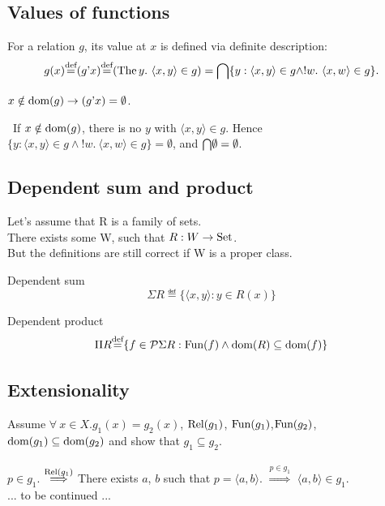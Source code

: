 \documentclass[10pt,a4paper]{article}
\begin{document}
\subsection{Values of functions}
For a relation $g$, its value at $x$ is defined via definite description:
$$g(x) {\stackrel{{\textrm{def}}}{=}} (g{\textrm{'}} x) {\stackrel{{\textrm{def}}}{=}} ({\textrm{The\,}} y.\ \langle x, y\rangle \in g) = {\bigcap} \{y : \langle x,y\rangle \in g \land !w.\ \langle x,w\rangle \in g\}.$$

\begin{exercise}
$x\notin {\textrm{dom}}(g)\to (g{\textrm{'}} x)=\emptyset$.
\end{exercise}
\myprf\ If $x \notin {\textrm{dom}}(g)$, there is no $y$ with $\langle x,y\rangle \in g$. Hence $\{y : \langle x,y\rangle \in g \land !w.\ \langle x,w\rangle \in g\} = \emptyset$, and ${\bigcap} \emptyset = \emptyset$. \myqed

\subsection{Dependent sum and product}
Let's assume that R is a family of sets.\\
There exists some W, such that $R:W\to{\textrm{Set}}$.\\
But the definitions are still correct if W is a proper class.\\
\begin{definition} Dependent sum
$$\Sigma R\eqdef\{\langle x, y\rangle: y\in R(x)\}$$
\end{definition}
\begin{definition} Dependent product
$$\Pi R{\stackrel{{\textrm{def}}}{=}}\{ f\in {\mathcal{P}}\Sigma R: {\textrm{Fun}}(f)\land {\textrm{dom}}(R)\subseteq {\textrm{dom}}(f)\}$$
\end{definition}

\subsection{Extensionality}
\begin{theorem}
Assume $\forall~x\in X. g_1(x)=g_2(x)$, ${\textrm{Rel}}(g_1)$, ${\textrm{Fun}}(g_1)$,${\textrm{Fun}}(g_2)$,\\ ${\textrm{dom}}(g_1)\subseteq{\textrm{dom}}(g_2)$ and show that $g_1\subseteq g_2$.\\
\myprf\\
$p\in g_1$.
$\stackrel{{\textrm{Rel}}(g_1)}{\Longrightarrow}$
There exists $a$, $b$ such that $p=\langle a, b\rangle$.
$\stackrel{p\in g_1}{\Longrightarrow}$ $\langle a, b\rangle\in g_1$.
\\
... to be continued ...
\\\myqed 
\end{theorem}
\end{document}
